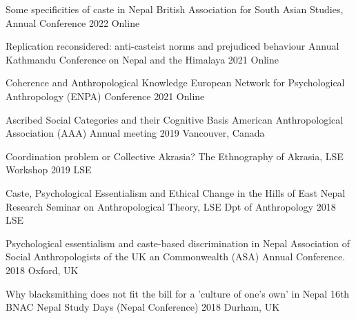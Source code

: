 

\begin{cvpresentations}



  \cvpresentation
    {Some specificities of caste in Nepal} %
    {British Association for South Asian Studies, Annual Conference} %
    {2022} %
    {Online} %

  \cvpresentation
    {Replication reconsidered: anti-casteist norms and prejudiced behaviour} %
    {Annual Kathmandu Conference on Nepal and the Himalaya} %
    {2021} %
    {Online} %

  \cvpresentation
    {Coherence and Anthropological Knowledge} %
    {European Network for Psychological Anthropology (ENPA) Conference} %
    {2021} %
    {Online} %

  \cvpresentation
    {Ascribed Social Categories and their Cognitive Basis} %
    {American Anthropological Association (AAA) Annual meeting} %
    {2019} %
    {Vancouver, Canada} %

  \cvpresentation
    {Coordination problem or Collective Akrasia?} %
    {The Ethnography of Akrasia, LSE Workshop} %
    {2019} %
    {LSE} %

  \cvpresentation
    {Caste, Psychological Essentialism and Ethical Change in the Hills of East Nepal} %
    {Research Seminar on Anthropological Theory, LSE Dpt of Anthropology} %
    {2018} %
    {LSE} %


  \cvpresentation
    {Psychological essentialism and caste-based discrimination in Nepal} %
    {Association of Social Anthropologists of the UK an Commonwealth (ASA) Annual Conference.} %
    {2018} %
    {Oxford, UK} %


  \cvpresentation
    {Why blacksmithing does not fit the bill for a ’culture of one’s own’ in Nepal} %
    {16th BNAC Nepal Study Days (Nepal Conference)} %
    {2018} %
    {Durham, UK} %

\end{cvpresentations}
